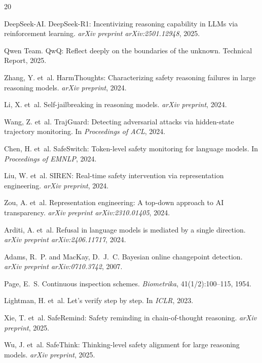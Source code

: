 \documentclass[11pt,a4paper]{article}
\begin{document}

\begin{thebibliography}{20}

DeepSeek-AI.
\newblock DeepSeek-R1: Incentivizing reasoning capability in LLMs via reinforcement learning.
\newblock \emph{arXiv preprint arXiv:2501.12948}, 2025.

Qwen Team.
\newblock QwQ: Reflect deeply on the boundaries of the unknown.
\newblock Technical Report, 2025.

Zhang, Y. et~al.
\newblock HarmThoughts: Characterizing safety reasoning failures in large reasoning models.
\newblock \emph{arXiv preprint}, 2024.

Li, X. et~al.
\newblock Self-jailbreaking in reasoning models.
\newblock \emph{arXiv preprint}, 2024.

Wang, Z. et~al.
\newblock TrajGuard: Detecting adversarial attacks via hidden-state trajectory monitoring.
\newblock In \emph{Proceedings of ACL}, 2024.

Chen, H. et~al.
\newblock SafeSwitch: Token-level safety monitoring for language models.
\newblock In \emph{Proceedings of EMNLP}, 2024.

Liu, W. et~al.
\newblock SIREN: Real-time safety intervention via representation engineering.
\newblock \emph{arXiv preprint}, 2024.

Zou, A. et~al.
\newblock Representation engineering: A top-down approach to AI transparency.
\newblock \emph{arXiv preprint arXiv:2310.01405}, 2024.

Arditi, A. et~al.
\newblock Refusal in language models is mediated by a single direction.
\newblock \emph{arXiv preprint arXiv:2406.11717}, 2024.

Adams, R.~P. and MacKay, D.~J.~C.
\newblock Bayesian online changepoint detection.
\newblock \emph{arXiv preprint arXiv:0710.3742}, 2007.

Page, E.~S.
\newblock Continuous inspection schemes.
\newblock \emph{Biometrika}, 41(1/2):100--115, 1954.

Lightman, H. et~al.
\newblock Let's verify step by step.
\newblock In \emph{ICLR}, 2023.

Xie, T. et~al.
\newblock SafeRemind: Safety reminding in chain-of-thought reasoning.
\newblock \emph{arXiv preprint}, 2025.

Wu, J. et~al.
\newblock SafeThink: Thinking-level safety alignment for large reasoning models.
\newblock \emph{arXiv preprint}, 2025.

\end{thebibliography}
\end{document}
